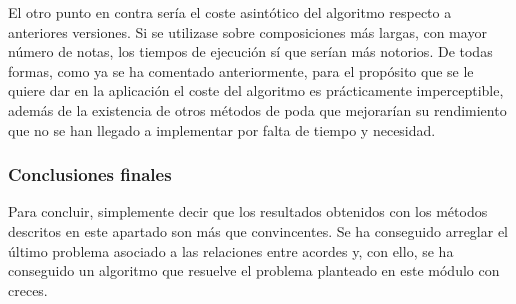 El otro punto en contra sería el coste asintótico del algoritmo respecto a anteriores versiones. Si se utilizase sobre composiciones más largas, con mayor número de notas, los tiempos de ejecución sí que serían más notorios. De todas formas, como ya se ha comentado anteriormente, para el propósito que se le quiere dar en la aplicación el coste del algoritmo es prácticamente imperceptible, además de la existencia de otros métodos de poda que mejorarían su rendimiento que no se han llegado a implementar por falta de tiempo y necesidad. 

\subsubsection{Conclusiones finales}

Para concluir, simplemente decir que los resultados obtenidos con los métodos descritos en este apartado son más que convincentes. Se ha conseguido arreglar el último problema asociado a las relaciones entre acordes y, con ello, se ha conseguido un algoritmo que resuelve el problema planteado en este módulo con creces.
    


    